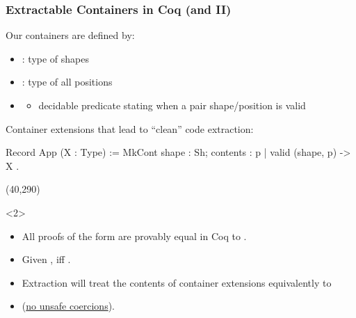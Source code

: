 \begin{frame}[fragile]
  \frametitle{Extractable Containers in Coq (and II)}
  Our containers are defined by:
  \begin{itemize}
    \item {}: type of shapes
    \item {}: type of \alert{all} positions
    \item {}
      \begin{itemize}
        \item[] \alert{decidable} predicate stating when a pair shape/position is valid
      \end{itemize}
  \end{itemize}
  \vspace{.6cm}

  Container extensions that lead to ``clean'' code extraction:
  \begin{coqcode}
    Record App (X : Type)
    := MkCont { shape : Sh;
                contents : {p | valid (shape, p)} -> X
              }.
  \end{coqcode}
  \Put(40,290){%
    \begin{onlyenv}<2>
    \begin{minipage}{.86\columnwidth}
    \begin{greenbox}
      \small
      \begin{itemize}
        \item All proofs of the form  are
              provably equal in Coq to .
        \item Given ,  iff .
        \item Extraction will treat the contents of container extensions equivalently to
              \item[] (\ul{no unsafe coercions}).
      \end{itemize}
    \end{greenbox}
    \end{minipage}
    \end{onlyenv}
  }
\end{frame}

